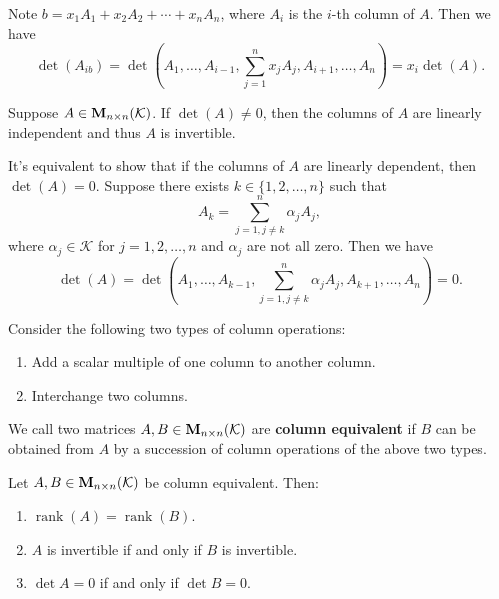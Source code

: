     \begin{proofenv}
        Note $b = x_1 A_1 + x_2 A_2 + \cdots + x_n A_n$, where $A_i$ is the $i$-th column of $A$.
        Then we have
        \[
        \det(A_{ib}) = \det(A_1, \ldots, A_{i-1}, \sum_{j=1}^n x_j A_j, A_{i+1}, \ldots, A_n) = x_i \det(A).
        \]
    \end{proofenv}
    \begin{theoremenv}
        Suppose $A\in \mathbf{M}_{n \times n}(\mathcal{K})$. If $\det(A) \neq 0$, then the columns of $A$ are linearly independent and thus $A$ is invertible.
    \end{theoremenv}
    \begin{proofenv}
        It's equivalent to show that if the columns of $A$ are linearly dependent, then $\det(A) = 0$. Suppose there exists $k\in \{1,2,\ldots,n\}$ such that 
        \[
        A_k = \sum_{j=1, j\neq k}^n \alpha_j A_j,
        \]
        where $\alpha_j \in \mathcal{K}$ for $j=1,2,\ldots,n$ and $\alpha_j$ are not all zero. Then we have
        \[
        \det(A) = \det(A_1, \ldots, A_{k-1}, \sum_{j=1, j\neq k}^n \alpha_j A_j, A_{k+1}, \ldots, A_n) = 0.
        \]
    \end{proofenv}
    \begin{definitionenv}
        Consider the following two types of column operations:
        \begin{enumerate}
            \item Add a scalar multiple of one column to another column.
            \item Interchange two columns.
        \end{enumerate}
        We call two matrices $A,B \in \mathbf{M}_{n \times n}(\mathcal{K})$ are \textbf{column equivalent} if $B$ can be obtained from $A$ by a succession of column operations of the above two types.
    \end{definitionenv}
    \begin{theoremenv}
            Let $A,B \in \mathbf{M}_{n \times n}(\mathcal{K})$ be column equivalent. Then:
            \begin{enumerate}
                \item $\operatorname{rank} (A) = \operatorname{rank}(B)$.
                \item $A$ is invertible if and only if $B$ is invertible.
                \item $\det A = 0$ if and only if $\det B = 0$.
            \end{enumerate}
    \end{theoremenv}
